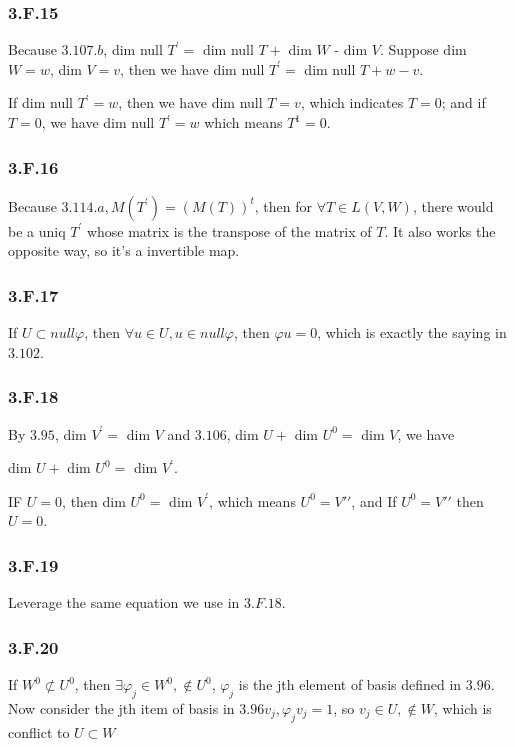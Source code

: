 \subsubsection*{3.F.15}
Because $3.107.b$, dim null $T^{'} = $ dim null $T +$ dim $W$ - dim $V$. Suppose dim $W = w$, dim $V = v$, then we have
dim null $T^{'} = $ dim null $T + w - v$.

If dim null $T^{'} = w$, then we have dim null $T =v$, which indicates $T = 0$; and if $T = 0$, we have dim null $T^{'} = w$ which means $T^{1} = 0$.

\subsubsection*{3.F.16}
Because $3.114.a, M(T^{'}) = (M(T))^{t}$, then for $\forall T\in L(V, W)$, there would be a uniq $T^{'}$ whose matrix is the transpose of the matrix of $T$. It also works the opposite way, so it's a invertible map.

\subsubsection*{3.F.17}

If $U\subset null \varphi$, then $\forall u\in U, u\in null \varphi$, then $\varphi u = 0$, which is exactly the saying in $3.102$.
\subsubsection*{3.F.18}
By $3.95 $, dim $V^{'} = $ dim $V$ and $3.106 $, dim $U +$ dim $U^{0} = $ dim $V$, we have

dim $U +$ dim $U^{0} = $ dim $V^{'}$. 

IF $U = 0$, then dim $U^{0} =$ dim $V^{'}$, which means $U^{0} = V'{'}$, and If $U^{0} = V'{'}$ then $U = 0$.

\subsubsection*{3.F.19}
Leverage the same equation we use in $3.F.18$.

\subsubsection*{3.F.20}

If $W^{0}\not\subset U^{0}$, then $\exists \varphi_{j} \in W^{0}, \notin U^{0}$, $\varphi_{j}$ is the jth element of basis defined in $3.96$. Now consider the jth item of basis in $3.96 v_{j}, \varphi_{j}v_{j} = 1$, so $v_{j} \in U, \notin W$, which is conflict to $U\subset W$

